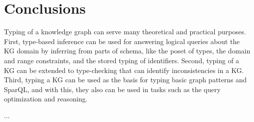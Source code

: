 \documentclass[runningheads]{llncs}
\begin{document}
\section{Conclusions\label{sec:conclude}}

Typing of a knowledge graph can serve many theoretical and practical
purposes. First, type-based inference can be used for answering
logical queries about the KG domain by inferring from parts
of schema, like the poset of types, the domain and range constraints,
and the stored typing of identifiers. Second, typing of a KG can be
extended to type-checking that can identify inconsistencies in a
KG. Third, typing a KG can be used as the basis for typing basic graph
patterns and SparQL, and with this, they also can be used in tasks
such as the query optimization and reasoning.


... \\





%



\end{document}
